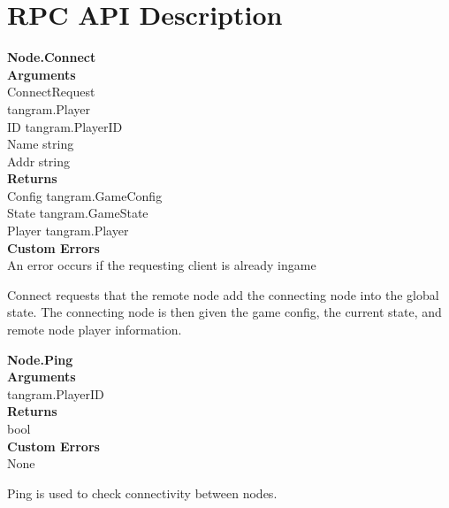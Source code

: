 \documentclass[twocolumn]{article}
\begin{document}
\section{RPC API Description}
\begin{flushleft}
\textbf{{\large Node.Connect}}\\
\textbf{Arguments}\\
\hspace*{2em}ConnectRequest\\
\hspace*{3em}tangram.Player\\
\hspace*{4em}ID tangram.PlayerID\\
\hspace*{4em}Name string\\
\hspace*{4em}Addr string\\
\textbf{Returns}\\
\hspace*{1em}Config tangram.GameConfig\\
\hspace*{1em}State tangram.GameState\\
\hspace*{1em}Player tangram.Player\\
\textbf{Custom Errors}\\
\hspace*{1em}An error occurs if the requesting client is already ingame
\end{flushleft}

Connect requests that the remote node add the connecting node into the global state. The connecting node is then given the game config, the current state, and remote node player information.

\begin{flushleft}
\textbf{{\large Node.Ping}}\\
\textbf{Arguments}\\
\hspace*{1em}tangram.PlayerID\\
\textbf{Returns}\\
\hspace*{1em}bool\\
\textbf{Custom Errors}\\
\hspace*{1em}None

\end{flushleft}

Ping is used to check connectivity between nodes.
\end{document}
